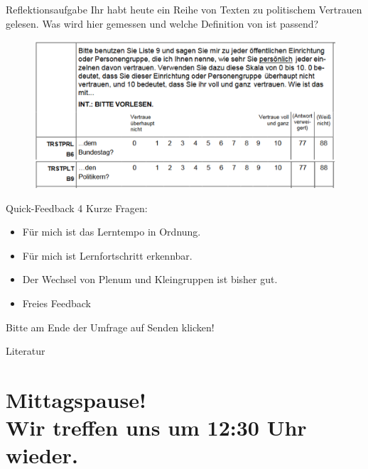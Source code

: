 \documentclass[11pt]{beamer}
\begin{document}
\begin{frame}[t]{Reflektionsaufgabe}
Ihr habt heute ein Reihe von Texten zu politischem Vertrauen gelesen. Was wird hier gemessen und welche Definition von  ist passend?

\begin{center}
	\begin{figure}[ht]
		\includegraphics[width=\textwidth]{pics/s5-1.png}
	\end{figure}
\end{center}

\end{frame}

\begin{frame}[t]{Quick-Feedback}
4 Kurze Fragen: 

\begin{itemize}
	\item Für mich ist das Lerntempo in Ordnung.
	\item Für mich ist Lernfortschritt erkennbar.
	\item Der Wechsel von Plenum und Kleingruppen ist bisher gut.
	\item Freies Feedback
\end{itemize}

Bitte am Ende der Umfrage auf Senden klicken!

\end{frame}

\renewcommand*{\bibfont}{\scriptsize}

\begin{frame}[allowframebreaks]{Literatur}
	\nocite{*}
	\printbibliography[heading = none]
\end{frame}

\section{Mittagspause! \\ Wir treffen uns um 12:30 Uhr wieder.}
\end{document}
